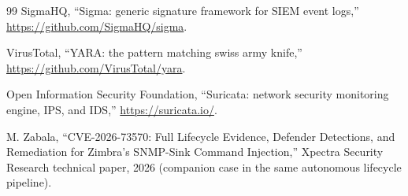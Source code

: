 \documentclass[journal]{IEEEtran}
\begin{document}
\begin{thebibliography}{99}
SigmaHQ, ``Sigma: generic signature framework for SIEM event logs,''
\url{https://github.com/SigmaHQ/sigma}.

VirusTotal, ``YARA: the pattern matching swiss army knife,''
\url{https://github.com/VirusTotal/yara}.

Open Information Security Foundation, ``Suricata: network security monitoring
engine, IPS, and IDS,'' \url{https://suricata.io/}.

M. Zabala, ``CVE-2026-73570: Full Lifecycle Evidence, Defender Detections, and
Remediation for Zimbra's SNMP-Sink Command Injection,'' Xpectra Security
Research technical paper, 2026 (companion case in the same autonomous
lifecycle pipeline).

\end{thebibliography}
\end{document}
